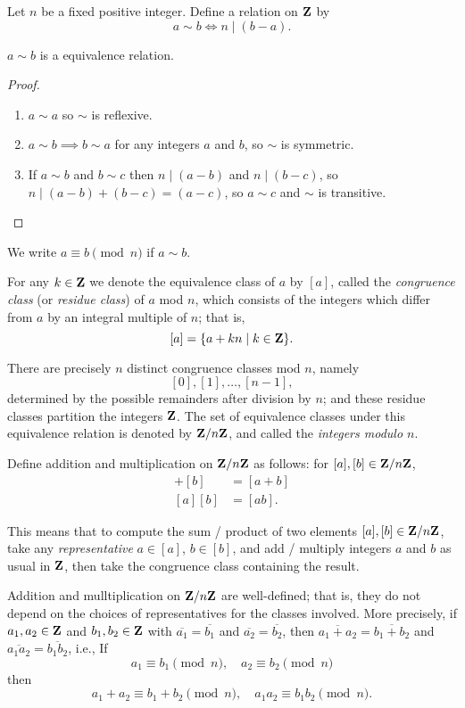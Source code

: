 \begin{example}
Let $n$ be a fixed positive integer. Define a relation on $\mathbf Z$ by
\[a\sim b\iff n\mid(b-a).\]
\begin{proposition}
$a\sim b$ is a equivalence relation.
\end{proposition}
\begin{proof} \
\begin{enumerate}[label=(\roman*)]
\item $a\sim a$ so $\sim$ is reflexive.
\item $a\sim b\implies b\sim a$ for any integers $a$ and $b$, so $\sim$ is symmetric.
\item If $a\sim b$ and $b\sim c$ then $n\mid(a-b)$ and $n\mid(b-c)$, so $n\mid(a-b)+(b-c)=(a-c)$, so $a\sim c$ and $\sim$ is transitive.
\end{enumerate}
\end{proof}

\begin{notation}
We write $a\equiv b\pmod n$ if $a\sim b$.
\end{notation}

\begin{notation}
For any $k\in\mathbf Z$ we denote the equivalence class of $a$ by $[a]$, called the \emph{congruence class} (or \emph{residue class}) of $a$ mod $n$, which consists of the integers which differ from $a$ by an integral multiple of $n$; that is,
\[[a]=\{a+kn\mid k\in\mathbf Z\}.\]
\end{notation}

There are precisely $n$ distinct congruence classes mod $n$, namely
\[[0],[1],\dots,[n-1],\]
determined by the possible remainders after division by $n$; and these residue classes partition the integers $\mathbf Z$. The set of equivalence classes under this equivalence relation is denoted by $\mathbf Z/n\mathbf Z$, and called the \emph{integers modulo $n$}.

Define addition and multiplication on $\mathbf Z/n\mathbf Z$ as follows: for $[a],[b]\in\mathbf Z/n\mathbf Z$,
\begin{align*}
[a]+[b]&=[a+b]\\
[a][b]&=[ab].
\end{align*}

This means that to compute the sum / product of two elements $[a],[b]\in\mathbf Z/n\mathbf Z$, take any \emph{representative} $a\in[a]$, $b\in[b]$, and add / multiply integers $a$ and $b$ as usual in $\mathbf Z$, then take the congruence class containing the result.

\begin{proposition}
Addition and mulltiplication on $\mathbf Z/n\mathbf Z$ are well-defined; that is, they do not depend on the choices of representatives for the classes involved. More precisely, if $a_1,a_2\in\mathbf Z$ and $b_1,b_2\in\mathbf Z$ with $\overline{a_1}=\overline{b_1}$ and $\overline{a_2}=\overline{b_2}$, then $\overline{a_1+a_2}=\overline{b_1+b_2}$ and $\overline{a_1a_2}=\overline{b_1b_2}$, i.e., If
\[a_1\equiv b_1\pmod n,\quad a_2\equiv b_2\pmod n\]
then
\[a_1+a_2\equiv b_1+b_2\pmod n,\quad a_1a_2\equiv b_1b_2\pmod n.\]
\end{proposition}


\end{example}
